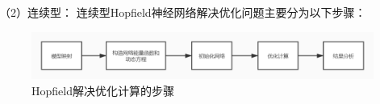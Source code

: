 （2）连续型：
连续型Hopfield神经网络解决优化问题主要分为以下步骤：
\begin{figure}[htbp]
    \centering
    \includegraphics[width=13cm]{figure/Hoplct.jpg}%
    \caption{Hopfield解决优化计算的步骤}
    \label{fig-Hoplct}
\end{figure}







